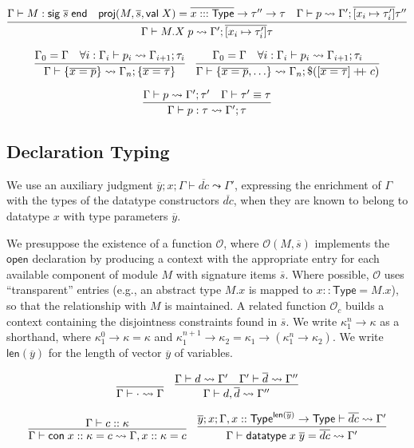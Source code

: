 \documentclass{article}
\newcommand{\mt}[1]{\mathsf{#1}}
\newcommand{\rc}{+ \hspace{-.075in} + \;}
\begin{document}
$$\infer{\Gamma \vdash M.X \; p \leadsto \Gamma'; \overline{[x_i \mapsto \tau'_i]}\tau}{
  \Gamma \vdash M : \mt{sig} \; \overline{s} \; \mt{end}
  & \mt{proj}(M, \overline{s}, \mt{val} \; X) = \overline{x ::: \mt{Type}} \to \tau'' \to \tau
  & \Gamma \vdash p \leadsto \Gamma'; \overline{[x_i \mapsto \tau'_i]}\tau''
}$$

$$\infer{\Gamma \vdash \{\overline{x = p}\} \leadsto \Gamma_n; \{\overline{x = \tau}\}}{
  \Gamma_0 = \Gamma
  & \forall i: \Gamma_i \vdash p_i \leadsto \Gamma_{i+1}; \tau_i
}
\quad \infer{\Gamma \vdash \{\overline{x = p}, \ldots\} \leadsto \Gamma_n; \$([\overline{x = \tau}] \rc c)}{
  \Gamma_0 = \Gamma
  & \forall i: \Gamma_i \vdash p_i \leadsto \Gamma_{i+1}; \tau_i
}$$

$$\infer{\Gamma \vdash p : \tau \leadsto \Gamma'; \tau}{
  \Gamma \vdash p \leadsto \Gamma'; \tau'
  & \Gamma \vdash \tau' \equiv \tau
}$$

\subsection{Declaration Typing}

We use an auxiliary judgment $\overline{y}; x; \Gamma \vdash \overline{dc} \leadsto \Gamma'$, expressing the enrichment of $\Gamma$ with the types of the datatype constructors $\overline{dc}$, when they are known to belong to datatype $x$ with type parameters $\overline{y}$.

We presuppose the existence of a function $\mathcal O$, where $\mathcal O(M, \overline{s})$ implements the $\mt{open}$ declaration by producing a context with the appropriate entry for each available component of module $M$ with signature items $\overline{s}$.  Where possible, $\mathcal O$ uses ``transparent'' entries (e.g., an abstract type $M.x$ is mapped to $x :: \mt{Type} = M.x$), so that the relationship with $M$ is maintained.  A related function $\mathcal O_c$ builds a context containing the disjointness constraints found in $\overline s$.
We write $\kappa_1^n \to \kappa$ as a shorthand, where $\kappa_1^0 \to \kappa = \kappa$ and $\kappa_1^{n+1} \to \kappa_2 = \kappa_1 \to (\kappa_1^n \to \kappa_2)$.  We write $\mt{len}(\overline{y})$ for the length of vector $\overline{y}$ of variables.

$$\infer{\Gamma \vdash \cdot \leadsto \Gamma}{}
\quad \infer{\Gamma \vdash d, \overline{d} \leadsto \Gamma''}{
  \Gamma \vdash d \leadsto \Gamma'
  & \Gamma' \vdash \overline{d} \leadsto \Gamma''
}$$

$$\infer{\Gamma \vdash \mt{con} \; x :: \kappa = c \leadsto \Gamma, x :: \kappa = c}{
  \Gamma \vdash c :: \kappa
}
\quad \infer{\Gamma \vdash \mt{datatype} \; x \; \overline{y} = \overline{dc} \leadsto \Gamma'}{
  \overline{y}; x; \Gamma, x :: \mt{Type}^{\mt{len}(\overline y)} \to \mt{Type} \vdash \overline{dc} \leadsto \Gamma'
}$$
\end{document}
